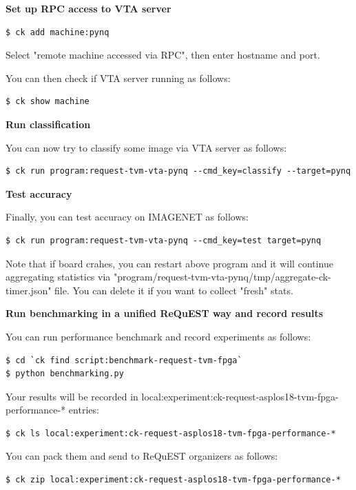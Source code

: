 \documentclass[sigconf]{acmart}
\begin{document}
\textbf{Set up RPC access to VTA server}

\begin{verbatim}
$ ck add machine:pynq
\end{verbatim}

Select "remote machine accessed via RPC", then enter hostname and port.

You can then check if VTA server running as follows:

\begin{verbatim}
$ ck show machine
\end{verbatim}

\textbf{Run classification}

You can now try to classify some image via VTA server as follows:

\begin{verbatim}
$ ck run program:request-tvm-vta-pynq --cmd_key=classify --target=pynq
\end{verbatim}

\textbf{Test accuracy}

Finally, you can test accuracy on IMAGENET as follows:

\begin{verbatim}
$ ck run program:request-tvm-vta-pynq --cmd_key=test target=pynq
\end{verbatim}

Note that if board crahes, you can restart above program and it will continue aggregating statistics
via "program/request-tvm-vta-pynq/tmp/aggregate-ck-timer.json" file. 
You can delete it if you want to collect "fresh" stats.

\textbf{Run benchmarking in a unified ReQuEST way and record results}

You can run performance benchmark and record experiments as follows:

\begin{verbatim}
$ cd `ck find script:benchmark-request-tvm-fpga`
$ python benchmarking.py
\end{verbatim}

Your results will be recorded in local:experiment:ck-request-asplos18-tvm-fpga-performance-* entries:
\begin{verbatim}
$ ck ls local:experiment:ck-request-asplos18-tvm-fpga-performance-*
\end{verbatim}

You can pack them and send to ReQuEST organizers as follows:

\begin{verbatim}
$ ck zip local:experiment:ck-request-asplos18-tvm-fpga-performance-*
\end{verbatim}
\end{document}
